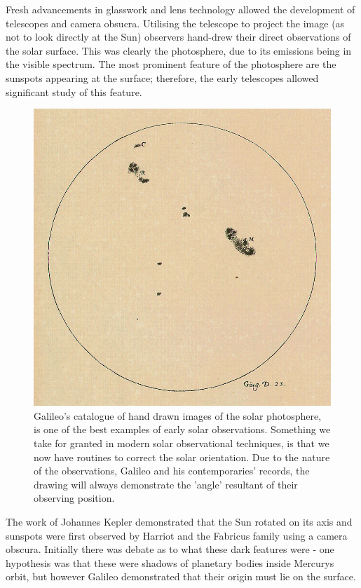 Fresh advancements in glasswork and lens technology allowed the development of telescopes and camera obsucra.
Utilising the telescope to project the image (as not to look directly at the Sun) observers hand-drew their direct observations of the solar surface.
This was clearly the photosphere, due to its emissions being in the visible spectrum. 
The most prominent feature of the photosphere are the sunspots appearing at the surface; therefore, the early telescopes allowed significant study of this feature.

\begin{figure}
	\includegraphics[width=\linewidth]{Chapter1/Figs/galileosunspot}
	\caption{Galileo's catalogue of hand drawn images of the solar photosphere, is one of the best examples of early solar observations. 
			Something we take for granted in modern solar observational techniques, is that we now have routines to correct the solar orientation.
			Due to the nature of the observations, Galileo and his contemporaries' records, the drawing will always demonstrate the 'angle' resultant of their observing position.}
	\label{fig:gali_sp}
\end{figure}

The work of Johannes Kepler demonstrated that the Sun rotated on its axis and sunspots were first observed by Harriot and the Fabricus family using a camera obscura. 
Initially there was debate as to what these dark features were - one hypothesis was that these were shadows of planetary bodies inside Mercurys orbit, but however Galileo demonstrated that their origin must lie on the surface.

